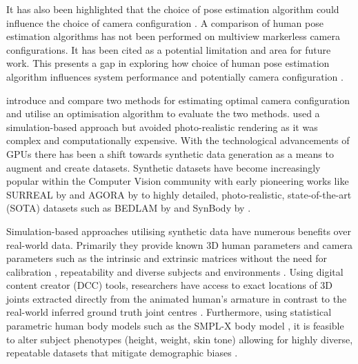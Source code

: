 It has also been highlighted that the choice of pose estimation algorithm could influence the choice of camera configuration \cite{samani2026optimizing}. 
A comparison of human pose estimation algorithms has not been performed on multiview markerless camera configurations. It has been cited as a potential limitation and area for future work. This presents a gap in exploring how choice of human pose estimation algorithm influences system performance and potentially camera configuration \cite{samani2026optimizing,kim2026comparison}.

\citet{rahimian2016optimal} introduce and compare two methods for estimating optimal camera configuration and utilise an optimisation algorithm to evaluate the two methods. 
\citet{jorgensen2018simulation} used a simulation-based approach but avoided photo-realistic rendering as it was complex and computationally expensive.
With the technological advancements of GPUs there has been a shift towards synthetic data generation as a means to augment and create datasets. Synthetic datasets have become increasingly popular within the Computer Vision community with early pioneering works like SURREAL by \citet{varol2017learning} and AGORA by \citet{patel2021agora} to highly detailed, photo-realistic, state-of-the-art (SOTA) datasets such as BEDLAM by \citet{black2023bedlam,tesch2025bedlam2} and SynBody by \citet{yang2023synbody}.

Simulation-based approaches utilising synthetic data have numerous benefits over real-world data. Primarily they provide known 3D human parameters and camera parameters such as the intrinsic and extrinsic matrices without the need for calibration \cite{black2023bedlam,jorgensen2018simulation}, repeatability and diverse subjects and environments \cite{black2023bedlam}. Using digital content creator (DCC) tools, researchers have access to exact locations of 3D joints extracted directly from the animated human's armature in contrast to the real-world inferred ground truth joint centres \cite{needham2021accuracy,patel2021agora}. Furthermore, using statistical parametric human body models such as the SMPL-X body model \cite{SMPL-X:2019}, it is feasible to alter subject phenotypes (height, weight, skin tone) allowing for highly diverse, repeatable datasets that mitigate demographic biases \cite{patel2021agora,black2023bedlam,yang2023synbody,bazavan2021hspace}.

